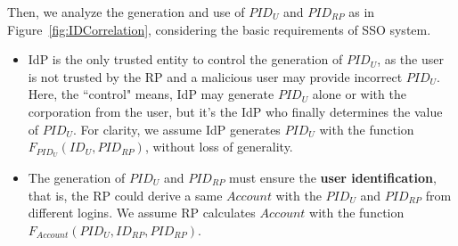 Then, we analyze the generation and use of $PID_U$ and $PID_{RP}$ as in Figure~\ref{fig:IDCorrelation}, considering the basic requirements of SSO system.
\begin{itemize}
  \item %
        IdP is the only trusted entity to control the generation of $PID_U$, as the user is not trusted by the RP and a malicious user may provide incorrect $PID_U$. Here, the ``control" means, IdP may generate $PID_U$ alone or with the corporation from the user, but it's the IdP who finally determines the value of $PID_U$. For clarity, we assume IdP generates $PID_U$ with the function $F_{PID_U}(ID_U, PID_{RP})$, without loss of generality.

  \item %
  The generation of $PID_{U}$ and $PID_{RP}$ must ensure the \textbf{user identification},
  that is, the RP could derive a same $Account$ with the $PID_{U}$ and $PID_{RP}$ from different logins. We assume RP calculates $Account$ with the function $F_{Account}(PID_U, ID_{RP}, PID_{RP})$.


\end{itemize}
